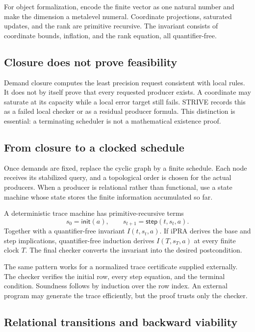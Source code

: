 For object formalization, encode the finite vector as one natural number and
make the dimension a metalevel numeral.  Coordinate projections, saturated
updates, and the rank are primitive recursive.  The invariant consists of
coordinate bounds, inflation, and the rank equation, all quantifier-free.

\subsection{Closure does not prove feasibility}

Demand closure computes the least precision request consistent with local
rules.  It does not by itself prove that every requested producer exists.  A
coordinate may saturate at its capacity while a local error target still fails.
STRIVE records this as a failed local checker or as a residual producer
formula.  This distinction is essential: a terminating scheduler is not a
mathematical existence proof.

\subsection{From closure to a clocked schedule}

Once demands are fixed, replace the cyclic graph by a finite schedule.
Each node receives its stabilized query, and a topological order is chosen for
the actual producers.  When a producer is relational rather than functional,
use a state machine whose state stores the finite information accumulated so
far.

A deterministic trace machine has primitive-recursive terms
\[
 s_0=\mathsf{init}(a),
 \qquad
 s_{t+1}=\mathsf{step}(t,s_t,a).
\]
Together with a quantifier-free invariant \(I(t,s_t,a)\).  If iPRA derives the base and
step implications, quantifier-free induction derives \(I(T,s_T,a)\) at every
finite clock \(T\).  The final checker converts the invariant into the desired
postcondition.

The same pattern works for a normalized trace certificate supplied externally.
The checker verifies the initial row, every step equation, and the terminal
condition.  Soundness follows by induction over the row index.  An external
program may generate the trace efficiently, but the proof trusts only the
checker.

\subsection{Relational transitions and backward viability}

